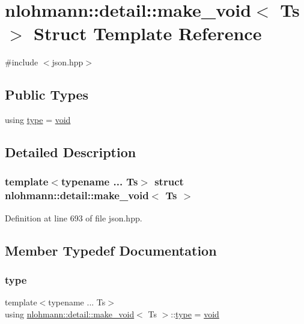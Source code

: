 \hypertarget{structnlohmann_1_1detail_1_1make__void}{}\section{nlohmann\+::detail\+::make\+\_\+void$<$ Ts $>$ Struct Template Reference}
\label{structnlohmann_1_1detail_1_1make__void}


{\ttfamily \#include $<$json.\+hpp$>$}

\subsection*{Public Types}
\begin{DoxyCompactItemize}
\item 
using \mbox{\hyperlink{structnlohmann_1_1detail_1_1make__void_a8961e24ae3b2cb65ec47d1ce805d94e4}{type}} = \mbox{\hyperlink{namespacenlohmann_1_1detail_a59fca69799f6b9e366710cb9043aa77d}{void}}
\end{DoxyCompactItemize}


\subsection{Detailed Description}
\subsubsection*{template$<$typename ... Ts$>$\newline
struct nlohmann\+::detail\+::make\+\_\+void$<$ Ts $>$}



Definition at line 693 of file json.\+hpp.



\subsection{Member Typedef Documentation}
\mbox{\label{structnlohmann_1_1detail_1_1make__void_a8961e24ae3b2cb65ec47d1ce805d94e4}} 
\subsubsection{\texorpdfstring{type}{type}}
{\footnotesize\ttfamily template$<$typename ... Ts$>$ \\
using \mbox{\hyperlink{structnlohmann_1_1detail_1_1make__void}{nlohmann\+::detail\+::make\+\_\+void}}$<$ Ts $>$\+::\mbox{\hyperlink{structnlohmann_1_1detail_1_1make__void_a8961e24ae3b2cb65ec47d1ce805d94e4}{type}} =  \mbox{\hyperlink{namespacenlohmann_1_1detail_a59fca69799f6b9e366710cb9043aa77d}{void}}}



